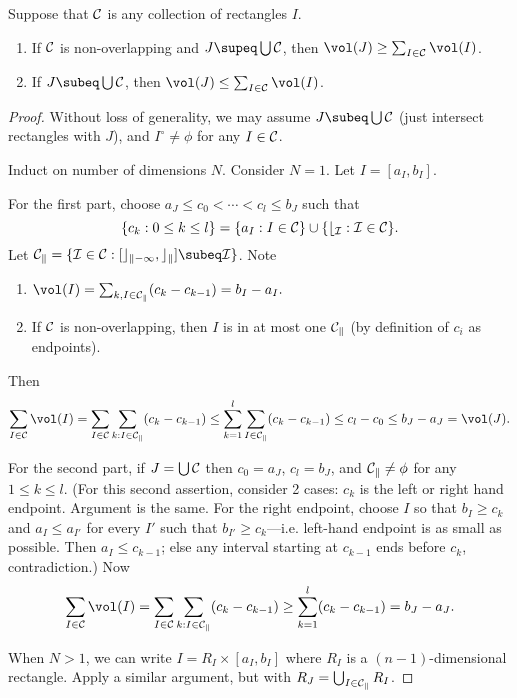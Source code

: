 \begin{lem}\label{coverineq}
Suppose that $\cal C$ is any collection of rectangles $I$.
\begin{enumerate}
\item 
If $\cal C$ is non-overlapping and $J\supeq \bigcup \cal C$, then $\vol(J)\geq \sum_{I\in \cal C}\vol(I)$. 
\item
If $J\subeq \bigcup \cal C$, then $\vol(J)\leq \sum_{I\in \cal C} \vol(I)$.
\end{enumerate}
\end{lem}
\begin{proof}
Without loss of generality, we may assume $J\subeq \bigcup \cal C$ (just intersect rectangles with $J$), and $I^{\circ}\neq \phi$ for any $I\in \cal C$.

Induct on number of dimensions $N$. Consider $N=1$. Let $I=[a_I,b_I]$.

For the first part, choose $a_J\leq c_0<\cdots <c_l\leq b_J$ such that 
\[
\{c_k:0\leq k\leq l\}=\{a_I:I\in \cal C\}\cup \{b_I:I\in \cal C\}.\]
Let $\cal C_k=\{I\in \cal C:[c_{k-1},c_k]\subeq I\}$.
Note
\begin{enumerate}
\item
$\vol(I)=\sum_{k, I\in \cal C_k} (c_k-c_{k-1})=b_I-a_I.$
\item 
If $\cal C$ is non-overlapping, then $I$ is in at most one $\cal C_k$ (by definition of $c_i$ as endpoints).
\end{enumerate}
Then
\[
\sum_{I\in \cal C} \vol(I) = \sum_{I\in \cal C} \sum_{k: I\in \cal C_k}(c_k-c_{k-1})
\leq \sum_{k=1}^l \sum_{I\in \cal C_k} (c_k-c_{k-1})
\leq c_l-c_0\leq b_J-a_J=\vol(J).
\]

For the second part, 
if $J=\bigcup \cal C$ then $c_0=a_J$, $c_l=b_J$, and $\cal C_k\neq \phi$ for any $1\leq k\leq l$. (For this second assertion, consider 2 cases: $c_k$ is the left or right hand endpoint. Argument is the same. For the right endpoint, choose $I$ so that $b_I\geq c_k$ and $a_I\leq a_{I'}$ for every $I'$ such that $b_{I'}\geq c_k$---i.e. left-hand endpoint is as small as possible. Then $a_I\leq c_{k-1}$; else any interval starting at $c_{k-1}$ ends before $c_k$,  %
contradiction.)
Now
\[
\sum_{I\in \cal C} \vol(I)=\sum_{I\in \cal C} \sum_{k:I\in \cal C_k} (c_k-c_{k-1})\geq \sum_{k=1}^l (c_k-c_{k-1})=b_J-a_J.
\]

When $N>1$, we can write $I=R_I\times [a_I,b_I]$ where $R_I$ is a $(n-1)$-dimensional rectangle. Apply a similar argument, but with  $R_J=\bigcup_{I\in \cal C_k} R_I$.
\end{proof}


